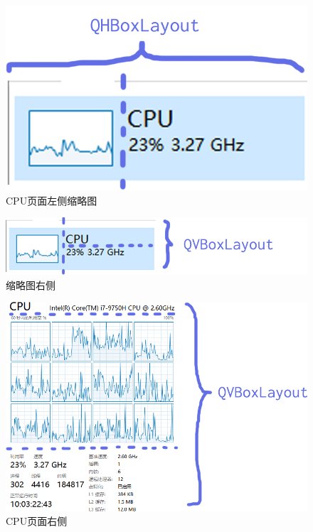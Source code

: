 \documentclass{beamer}
\begin{document}
\begin{frame}
    \begin{figure}[htb]
        \centering
        \includegraphics[scale=0.35]{../media/layout/thumbnail.png}
        \caption{CPU页面左侧缩略图}
        \label{fig:thumbnail}
    \end{figure}
\end{frame}

\begin{frame}
    \begin{figure}[htb]
        \centering
        \includegraphics[scale=0.35]{../media/layout/thumbnail right.png}
        \caption{缩略图右侧}
        \label{fig:thumbnailright}
    \end{figure}
\end{frame}

\begin{frame}
    \begin{figure}
        \centering
        \includegraphics[scale=0.4]{../media/layout/cpupage right.png}
        \caption{CPU页面右侧}
        \label{fig:cpuright}
    \end{figure}
\end{frame}
\end{document}
